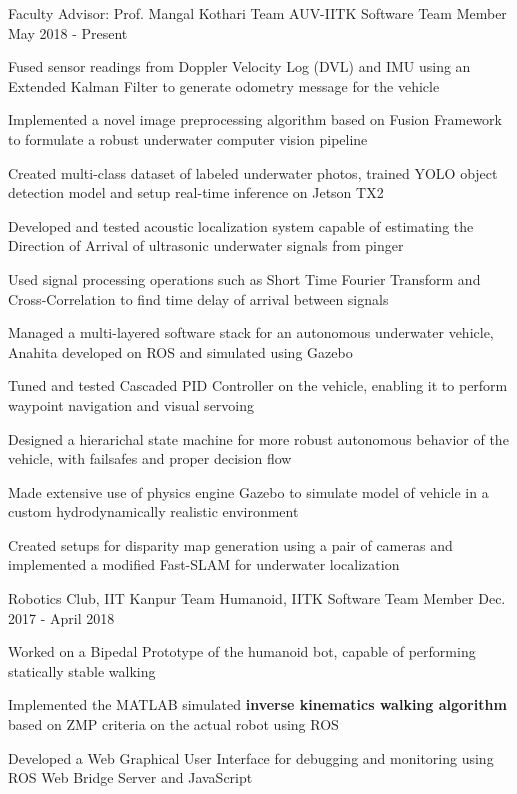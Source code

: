 
\begin{cventries}

  \cventry
    {Faculty Advisor: Prof. Mangal Kothari}
    {Team AUV-IITK}
    {Software Team Member}
    {May 2018 - Present}
    {
      \begin{cvitems}
        \item{Fused sensor readings from Doppler Velocity Log (DVL) and IMU using an Extended Kalman Filter to generate odometry message for the vehicle}
        \item{Implemented a novel image preprocessing algorithm based on Fusion Framework to formulate a robust underwater computer vision pipeline}
        \item{Created multi-class dataset of labeled underwater photos, trained YOLO object detection model and setup real-time inference on Jetson TX2}
        \item{Developed and tested acoustic localization system capable of estimating the Direction of Arrival of ultrasonic underwater signals from pinger}
        \item{Used signal processing operations such as Short Time Fourier Transform and Cross-Correlation to find time delay of arrival between signals}
        \item{Managed a multi-layered software stack for an autonomous underwater vehicle, Anahita developed on ROS and simulated using Gazebo}
        \item{Tuned and tested Cascaded PID Controller on the vehicle, enabling it to perform waypoint navigation and visual servoing}
        \item{Designed a hierarichal state machine for more robust autonomous behavior of the vehicle, with failsafes and proper decision flow}
        \item{Made extensive use of physics engine Gazebo to simulate model of vehicle in a custom hydrodynamically realistic environment}
        \item{Created setups for disparity map generation using a pair of cameras and implemented a modified Fast-SLAM for underwater localization}
      \end{cvitems}
    }
  
  \cventry
    {Robotics Club, IIT Kanpur}
    {Team Humanoid, IITK}
    {Software Team Member}
    {Dec. 2017 - April 2018} 
    {
      \begin{cvitems} 
        \item {Worked on a Bipedal Prototype of the humanoid bot, capable of performing statically stable walking}
        \item {Implemented the MATLAB simulated \textbf{inverse kinematics walking algorithm} based on ZMP criteria on the actual robot using ROS}
        \item {Developed a Web Graphical User Interface for debugging and monitoring using ROS Web Bridge Server and JavaScript}
      \end{cvitems}
    }

\end{cventries}
